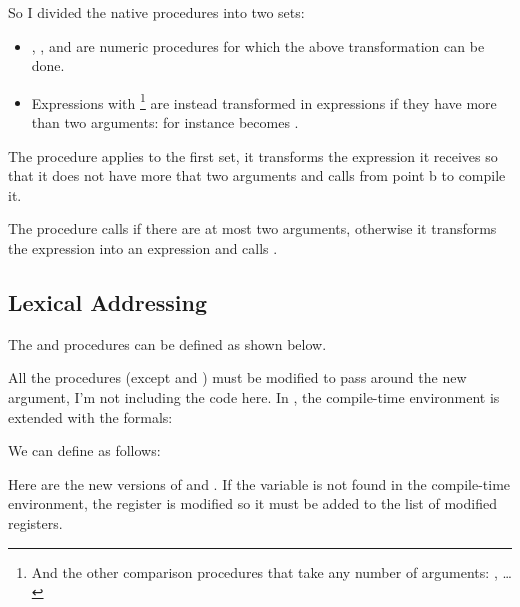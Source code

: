 \begin{exe}[5.38]
\begin{enumerate}
	    So I divided the native procedures into two sets:
	    \begin{itemize}
		\item \vscm{+}, \vscm{-}, \vscm{*} and \vscm{/} are numeric 
		    procedures for which the above transformation can be done.
		\item Expressions with \vscm{=}\footnote{And the other 
		    comparison procedures that take any number of arguments: 
		    \vscm{<}, \vscm{>}…} are instead transformed in  
		    expressions if they have more than two arguments: for 
		    instance becomes
		    .
	    \end{itemize}
	    The  procedure applies to the first set, 
	    it transforms the expression it receives so that it does not have 
	    more that two arguments and calls  from 
	    point b to compile it.

	    The  procedure calls 
	     if there are at most two arguments, 
	    otherwise it transforms the expression into an  expression 
	    and calls .
    \end{enumerate}
\end{exe}

\subsection{Lexical Addressing}

\begin{exe}[5.39]
    The  and  procedures 
    can be defined as shown below.
\end{exe}

\begin{exe}[5.40]
    All the  procedures (except  
    and ) must be modified to pass around the new argument, 
    I’m not including the code here. In , the 
    compile-time environment is extended with the formals:
\end{exe}

\begin{exe}[5.41]
    We can define  as follows:
\end{exe}

\begin{exe}[5.42]
    Here are the new versions of  and 
    . If the variable is not found in the compile-time 
    environment, the  register is modified so it must be added to the 
    list of modified registers.
\end{exe}
